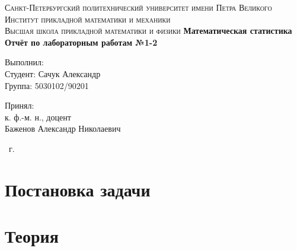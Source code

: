 \documentclass[14pt,a4paper,article]{ncc}
\begin{document}
\begin{titlepage}
    \begin{center}
        \textsc{
            Санкт-Петербургский политехнический университет имени Петра Великого \\[5mm]
            Институт прикладной математики и механики\\[2mm]
            Высшая школа прикладной математики и физики            
        }   
        \vfill
        \textbf{\large
            Математическая статистика\\
            Отчёт по лабораторным работам №1-2 \\[3mm]
        }                
    \end{center}

    \vfill
    \hfill
    \begin{minipage}{0.5\textwidth}
        Выполнил: \\[2mm]   
		Студент: Сачук Александр \\
		Группа: 5030102/90201\\
    \end{minipage}

	\hfill
	\begin{minipage}{0.5\textwidth}
		Принял: \\[2mm]
		к. ф.-м. н., доцент \\   
		Баженов Александр Николаевич
	\end{minipage}

    \vfill
    \begin{center}
        \theyear\ г.
    \end{center}
\end{titlepage}

\tableofcontents
\newpage
\listoffigures
\newpage
\listoftables
\newpage

\section{Постановка задачи}

\begin{enumerate}




\end{enumerate}
\newpage

\section{Теория}





\newpage
\end{document}
